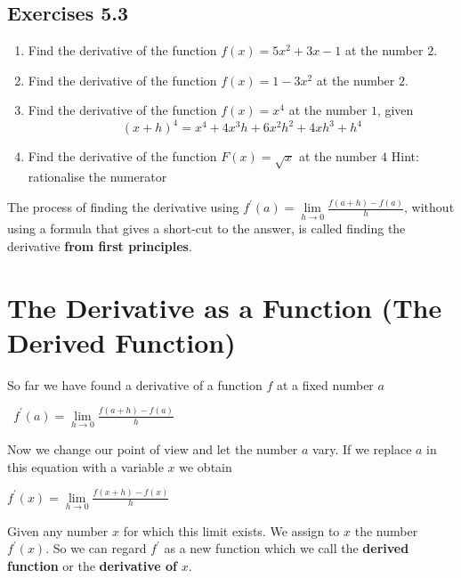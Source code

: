 \subsection{Exercises 5.3}
\begin{enumerate}
\item Find the derivative of the function $f (x) =5 x^{2} +3 x -1$ at the number $2$. 

\item Find the derivative of the function $f (x) =1 -3 x^{2}$ at the number $2$. 

\item Find the derivative of the function $f (x) =x^{4}$ at the number $1$, given
\begin{equation*}(x +h)^{4} =x^{4} +4 x^{3} h +6 x^{2} h^{2} +4 x h^{3} +h^{4}
\end{equation*}

\item Find the derivative of the function $F (x) =\sqrt{x}$ at the number $4$ Hint: rationalise the numerator \end{enumerate}


The process of finding the derivative using $f^{ \prime } (a) =\underset{h \rightarrow 0}{\lim }\frac{f (a +h) -f (a)}{h}\text{,}$ without using a formula that gives a short-cut to the answer, is called finding the derivative \textbf{from first principles}.


\section{The Derivative as a Function (The Derived Function)}
So far we have found a derivative of a function $f$ at a fixed number $a$ 


\begin{center}
\ $f^{ \prime } (a) =\underset{h \rightarrow 0}{\lim }\frac{f (a +h) -f (a)}{h}$
\end{center}\par
Now we change our point of view and let the number $a$ vary. If we replace $a$ in this equation with a variable $x$ we obtain 


\begin{center}
$f^{ \prime } (x) =\underset{h \rightarrow 0}{\lim }\frac{f (x +h) -f (x)}{h}$
\end{center}\par
Given any number $x$ for which this limit exists. We assign to $x$ the number $f^{ \prime } \left (x\right )$. So we can regard $f^{ \prime }$ as a new function which we call the \textbf{derived function} or the \textbf{derivative
of }$x$. 

